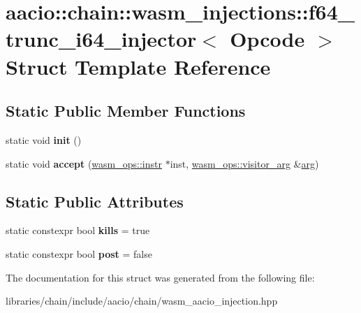 \hypertarget{structaacio_1_1chain_1_1wasm__injections_1_1f64__trunc__i64__injector}{}\section{aacio\+:\+:chain\+:\+:wasm\+\_\+injections\+:\+:f64\+\_\+trunc\+\_\+i64\+\_\+injector$<$ Opcode $>$ Struct Template Reference}
\label{structaacio_1_1chain_1_1wasm__injections_1_1f64__trunc__i64__injector}
\subsection*{Static Public Member Functions}
\begin{DoxyCompactItemize}
\item 
\mbox{\label{structaacio_1_1chain_1_1wasm__injections_1_1f64__trunc__i64__injector_a355fd560be1047a5d72231ba5aef5c42}} 
static void {\bfseries init} ()
\item 
\mbox{\label{structaacio_1_1chain_1_1wasm__injections_1_1f64__trunc__i64__injector_acff7c3f814eaec51cef55ced528ba60d}} 
static void {\bfseries accept} (\mbox{\hyperlink{structaacio_1_1chain_1_1wasm__ops_1_1instr}{wasm\+\_\+ops\+::instr}} $\ast$inst, \mbox{\hyperlink{structaacio_1_1chain_1_1wasm__ops_1_1visitor__arg}{wasm\+\_\+ops\+::visitor\+\_\+arg}} \&\mbox{\hyperlink{unionarg}{arg}})
\end{DoxyCompactItemize}
\subsection*{Static Public Attributes}
\begin{DoxyCompactItemize}
\item 
\mbox{\label{structaacio_1_1chain_1_1wasm__injections_1_1f64__trunc__i64__injector_a56fe4f3d115fa2c608afa6a891e69b40}} 
static constexpr bool {\bfseries kills} = true
\item 
\mbox{\label{structaacio_1_1chain_1_1wasm__injections_1_1f64__trunc__i64__injector_a5afe5333dd0a097b325fa6dc4f7b0f3d}} 
static constexpr bool {\bfseries post} = false
\end{DoxyCompactItemize}


The documentation for this struct was generated from the following file\+:\begin{DoxyCompactItemize}
\item 
libraries/chain/include/aacio/chain/wasm\+\_\+aacio\+\_\+injection.\+hpp\end{DoxyCompactItemize}
